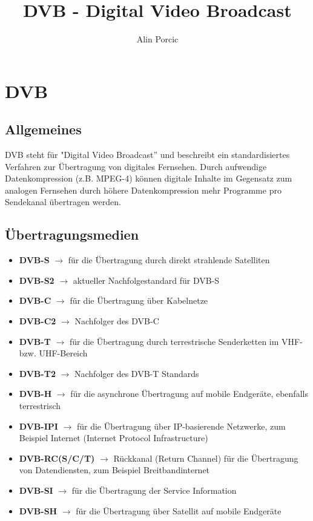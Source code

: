 \documentclass[a4paper]{article}
\author{Alin Porcic}
\title{DVB - Digital Video Broadcast}
\begin{document}
\maketitle
\newpage

\section{DVB}

\subsection{Allgemeines}

DVB steht für "Digital Video Broadcast'' und beschreibt ein standardisiertes Verfahren zur Übertragung von digitales Fernsehen. Durch aufwendige Datenkompression (z.B. MPEG-4) können digitale Inhalte im Gegensatz zum analogen Fernsehen durch höhere Datenkompression mehr Programme pro Sendekanal übertragen werden. 

\subsection{Übertragungsmedien}

\begin{itemize}
\item \textbf{DVB-S} $\rightarrow$ für die Übertragung durch direkt strahlende Satelliten 
\item \textbf{DVB-S2} $\rightarrow$ aktueller Nachfolgestandard für DVB-S
\item \textbf{DVB-C} $\rightarrow$ für die Übertragung über Kabelnetze
\item \textbf{DVB-C2} $\rightarrow$ Nachfolger des DVB-C
\item \textbf{DVB-T} $\rightarrow$ für die Übertragung durch terrestrische Senderketten im VHF- bzw. UHF-Bereich
\item \textbf{DVB-T2} $\rightarrow$ Nachfolger des DVB-T Standards
\item \textbf{DVB-H} $\rightarrow$ für die asynchrone Übertragung auf mobile Endgeräte, ebenfalls terrestrisch
\item \textbf{DVB-IPI} $\rightarrow$ für die Übertragung über IP-basierende Netzwerke, zum Beispiel Internet (Internet Protocol Infrastructure)
\item \textbf{DVB-RC(S/C/T)} $\rightarrow$ Rückkanal (Return Channel) für die Übertragung von Datendiensten, zum Beispiel Breitbandinternet
\item \textbf{DVB-SI} $\rightarrow$ für die Übertragung der Service Information
\item \textbf{DVB-SH} $\rightarrow$ für die Übertragung über Satellit auf mobile Endgeräte
\end{itemize}
\end{document}
